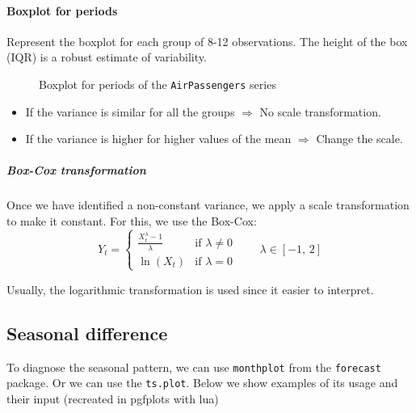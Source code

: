 \paragraph{Boxplot for periods} Represent the boxplot for each group of 8-12
observations. The height of the box (IQR) is a robust estimate of variability.

\begin{figure}[H]
	\caption{Boxplot for periods of the \texttt{AirPassengers} series}
\end{figure}

\begin{itemize}
    \item If the variance is similar for all the groups $\Longrightarrow$ No scale transformation.
    \item If the variance is higher for higher values of the mean $\Longrightarrow$ Change the scale.
\end{itemize}

\subparagraph{Box-Cox transformation}
Once we have identified a non-constant variance, we apply a scale
transformation to make it constant. For this, we use the Box-Cox:
\begin{equation}
    Y_t = \begin{cases}
        \frac{X_t^\lambda - 1}{\lambda} & \text{if } \lambda \neq 0 \\
        \ln(X_t) & \text{if } \lambda = 0
    \end{cases} \qquad \lambda \in [-1,\,2]
\end{equation}
\begin{marker}
    Usually, the logarithmic transformation is used since it easier to interpret.
\end{marker}

\subsection{Seasonal difference}
To diagnose the seasonal pattern, we can use \texttt{monthplot}
from the \texttt{forecast} package. Or we can use the \texttt{ts.plot}. Below we show examples of its usage and their input (recreated in pgfplots with lua)

